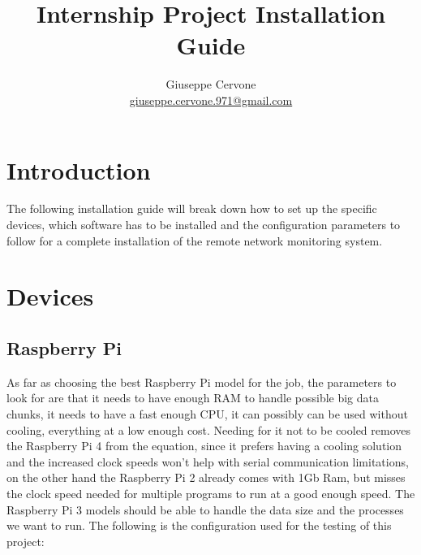 \documentclass[a4paper,11pt]{scrartcl}
\title{Internship Project Installation Guide}
\date{}
\author{Giuseppe Cervone\\ \url{giuseppe.cervone.971@gmail.com}}
\begin{document}
\maketitle

\section{Introduction}
The following installation guide will break down how to set up the specific devices, which software has to be installed and the configuration parameters to follow for a complete installation of the remote network monitoring system.

\section{Devices}
\subsection{Raspberry Pi}
As far as choosing the best Raspberry Pi model for the job, the parameters to look for are that it needs to have enough RAM to handle possible big data chunks, it needs to have a fast enough CPU, it can possibly can be used without cooling, everything at a low enough cost. Needing for it not to be cooled removes the Raspberry Pi 4 from the equation, since it prefers having a cooling solution and the increased clock speeds won't help with serial communication limitations, on the other hand the Raspberry Pi 2 already comes with 1Gb Ram, but misses the clock speed needed for multiple programs to run at a good enough speed. 
The Raspberry Pi 3 models should be able to handle the data size and the processes we want to run. The following is the configuration used for the testing of this project:
\end{document}
